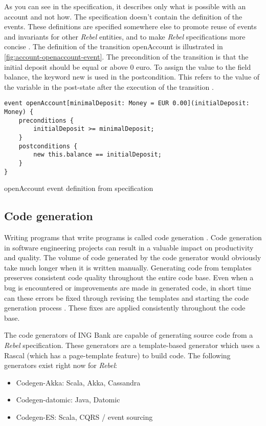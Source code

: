 As you can see in the specification, it describes only what is possible with an account and not how. The specification doesn't contain the definition of the events. These definitions are specified somewhere else to promote reuse of events and invariants for other \textit{Rebel} entities, and to make \textit{Rebel} specifications more concise \cite[p.4]{stoel_storm_vinju_bosman_2016}.
The definition of the transition openAccount is illustrated in \autoref{fig:account-openaccount-event}. The precondition of the transition is that the initial deposit should be equal or above 0 euro. To assign the value to the field balance, the keyword new is used in the postcondition. This refers to the value of the variable in the post-state after the execution of the transition \cite[p.4]{stoel_storm_vinju_bosman_2016}.

\begin{sourcecode}[h]
\begin{lstlisting}[]
event openAccount[minimalDeposit: Money = EUR 0.00](initialDeposit: Money) {
	preconditions {
		initialDeposit >= minimalDeposit;
	}
	postconditions {
		new this.balance == initialDeposit;
	}
}
\end{lstlisting}
\caption{openAccount event definition from specification}
\label{fig:account-openaccount-event}
\end{sourcecode}

\subsection{Code generation}

Writing programs that write programs is called code generation \cite[p.3]{herrington2003code}. Code generation in software engineering projects can result in a valuable impact on productivity and quality. The volume of code generated by the code generator would obviously take much longer when it is written manually. Generating code from templates preserves consistent code quality throughout the entire code base. Even when a bug is encountered or improvements are made in generated code, in short time can these errors be fixed through revising the templates and starting the code generation process \cite[p.15-17]{herrington2003code}. These fixes are applied consistently throughout the code base. 

The code generators of ING Bank are capable of generating source code from a \textit{Rebel} specification. These generators are a template-based generator which uses a Rascal (which has a page-template feature)\cite{RascalGTTSE} to build code. The following generators exist right now for \textit{Rebel}:
\begin{itemize}
\item Codegen-Akka: Scala, Akka, Cassandra
\item Codegen-datomic: Java, Datomic
\item Codegen-ES: Scala, CQRS / event sourcing
\end{itemize}

